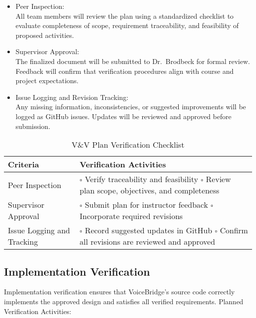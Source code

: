 \documentclass[12pt, titlepage]{article}
\begin{document}
\begin{itemize}
    \item Peer Inspection: \\
    All team members will review the plan using a standardized checklist to evaluate completeness of scope, requirement traceability, and feasibility of proposed activities.

    \item Supervisor Approval: \\
    The finalized document will be submitted to Dr.~Brodbeck for formal review. Feedback will confirm that verification procedures align with course and project expectations.

    \item Issue Logging and Revision Tracking: \\
    Any missing information, inconsistencies, or suggested improvements will be logged as GitHub issues. Updates will be reviewed and approved before submission.
\end{itemize}

\begin{table}[H]
\centering
\caption{V\&V Plan Verification Checklist}
\renewcommand{\arraystretch}{1.3}
\begin{tabular}{|p{5.5cm}|p{8cm}|}
\hline
Criteria & Verification Activities \\ \hline
Peer Inspection &
\(\square\) Verify traceability and feasibility  \newline
\(\square\) Review plan scope, objectives, and completeness \\ \hline
Supervisor Approval &
\(\square\) Submit plan for instructor feedback \newline
\(\square\) Incorporate required revisions \\ \hline
Issue Logging and Tracking &
\(\square\) Record suggested updates in GitHub \newline
\(\square\) Confirm all revisions are reviewed and approved \\ \hline
\end{tabular}
\end{table}

\subsection{Implementation Verification}

Implementation verification ensures that VoiceBridge’s source code correctly implements the approved design and satisfies all verified requirements. Planned Verification Activities:
\end{document}
